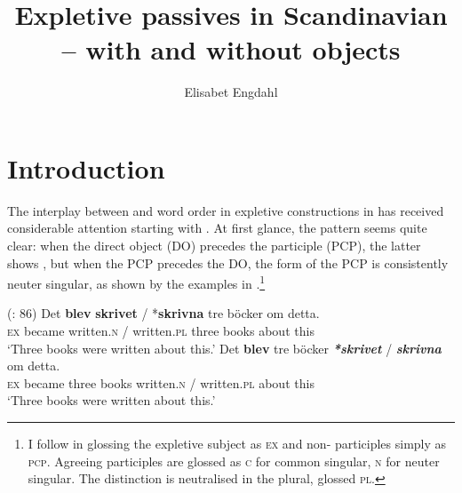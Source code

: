 \documentclass[output=paper]{LSP/langsci}
\author{Elisabet Engdahl\affiliation{University of Gothenburg}
}
\title{Expletive passives in Scandinavian -- with and without objects}
\begin{document}
\section{Introduction}%
\largerpage

The interplay between  and word order in expletive  constructions in  has received considerable attention starting with \cite{ChristensenTaraldsen1989}. At first glance, the pattern seems quite clear: when the direct object (DO) precedes the participle (PCP), the latter shows , but when the PCP precedes the DO, the form of the PCP is consistently neuter singular, as shown by the  examples in .\footnote{I follow \citet[104]{Holmberg2002Expletives} in glossing the expletive subject as \textsc{ex} and non- participles simply as \textsc{pcp}. Agreeing participles are glossed as \textsc{c} for common  singular, \textsc{n} for neuter singular. The  distinction is neutralised in the plural, glossed \textsc{pl}. 
}

\ea%
    \label{ex:engdahl:1}
     (\citealt{Holmberg2002Expletives}: 86)
\ea\label{ex:engdahl:1a}
\gll Det \textbf{blev}     \textbf{skrivet} /     *\textbf{skrivna}     tre     böcker   om     detta. \\
  \textsc{ex}   became written.\textsc{n} /    written\textsc{.pl}   three books     about   this \\
\glt ‘Three books were written about this.'
\ex\label{ex:engdahl:1b}
\gll    Det     \textbf{blev}     tre     böcker \textbf{\textit{*skrivet}} /     \textbf{\textit{skrivna}}     om     detta.\\
  \textsc{ex}   became three  books     written.\textsc{n} / written.\textsc{pl} about  this \\
  \glt ‘Three books were written about this.'
\z
\z
\end{document}
